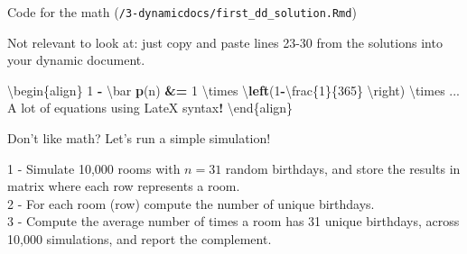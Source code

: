 \documentclass[ignorenonframetext,]{beamer}
\newenvironment{Shaded}{\begin{snugshade}}{\end{snugshade}}
\newcommand{\DecValTok}[1]{\textcolor[rgb]{0.00,0.00,0.81}{#1}}
\newcommand{\ErrorTok}[1]{\textcolor[rgb]{0.64,0.00,0.00}{\textbf{#1}}}
\newcommand{\KeywordTok}[1]{\textcolor[rgb]{0.13,0.29,0.53}{\textbf{#1}}}
\newcommand{\NormalTok}[1]{#1}
\newcommand{\OperatorTok}[1]{\textcolor[rgb]{0.81,0.36,0.00}{\textbf{#1}}}
\newcommand{\StringTok}[1]{\textcolor[rgb]{0.31,0.60,0.02}{#1}}
\begin{document}
\begin{frame}[fragile]{Code for the math
(\texttt{/3-dynamicdocs/first\_dd\_solution.Rmd})}
\protect\hypertarget{code-for-the-math-3-dynamicdocsfirst_dd_solution.rmd}{}

Not relevant to look at: just copy and paste lines 23-30 from the
solutions into your dynamic document.

\begin{Shaded}
\begin{Highlighting}[]
\NormalTok{\textbackslash{}begin\{align\} }
 \DecValTok{1} \OperatorTok{-}\StringTok{ }\NormalTok{\textbackslash{}bar }\KeywordTok{p}\NormalTok{(n) }\OperatorTok{&}\ErrorTok{=}\StringTok{ }\DecValTok{1}\NormalTok{ \textbackslash{}times \textbackslash{}}\KeywordTok{left}\NormalTok{(}\DecValTok{1}\OperatorTok{-}\NormalTok{\textbackslash{}frac\{}\DecValTok{1}\NormalTok{\}\{}\DecValTok{365}\NormalTok{\}}
\NormalTok{                                 \textbackslash{}right) }
\NormalTok{ \textbackslash{}times ...}
\NormalTok{ A lot of equations using LateX syntax}\OperatorTok{!}
\NormalTok{\textbackslash{}end\{align\}}
\end{Highlighting}
\end{Shaded}

\end{frame}

\begin{frame}{Don't like math? Let's run a simple simulation!}
\protect\hypertarget{dont-like-math-lets-run-a-simple-simulation}{}

1 - Simulate 10,000 rooms with \(n = 31\) random birthdays, and store
the results in matrix where each row represents a room.\\
2 - For each room (row) compute the number of unique birthdays.\\
3 - Compute the average number of times a room has 31 unique birthdays,
across 10,000 simulations, and report the complement.

\end{frame}
\end{document}

